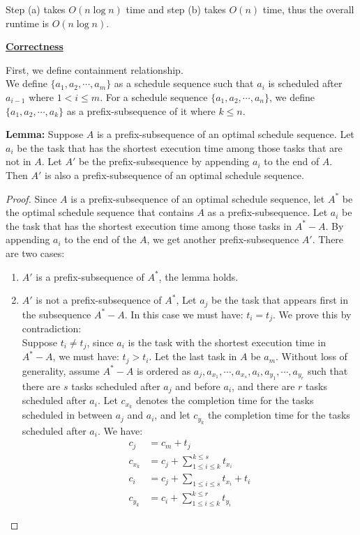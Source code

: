 \documentclass[11pt]{article}
\begin{document}
\begin{enumerate}
Step (a) takes $O(n\log n)$ time and step (b) takes $O(n)$ time, thus
the overall runtime is $O(n\log n)$.

\underline{\textbf{Correctness}}

First, we define containment relationship.\\
We define $\{a_1,a_2,\cdots,a_m\}$ as a schedule sequence such that $a_i$
is scheduled after $a_{i-1}$ where $1 < i \leq m$.
For a schedule sequence $\{a_1,a_2,\cdots,a_n\}$, we define
$\{a_1,a_2,\cdots,a_k\}$ as a prefix-subsequence of it where $k \leq n$.

\textbf{Lemma:} Suppose $A$ is a prefix-subsequence of an optimal schedule
sequence. Let $a_i$ be the task that has the shortest execution time
among those tasks that are not in $A$. Let $A'$ be the
prefix-subsequence by appending $a_i$ to the end of $A$.
Then $A'$ is also a prefix-subsequence of an optimal schedule sequence.

\begin{proof}
  Since $A$ is a prefix-subsequence of an optimal schedule sequence,
  let $A^*$ be the optimal schedule sequence that contains $A$ as a
  prefix-subsequence. Let $a_i$ be the task that has the shortest
  execution time among those tasks in $A^*-A$. By appending $a_i$ to
  the end of the $A$, we get another prefix-subsequence $A'$. There
  are two cases:
  \begin{enumerate}
  \item $A'$ is a prefix-subsequence of $A^*$, the lemma holds.
  \item $A'$ is not a prefix-subsequence of $A^*$, Let $a_j$ be the
    task that appears first in the subsequence $A^*-A$. In
    this case we must have: $t_i = t_j$. We prove this by 
    contradiction:\\
    Suppose $t_i \neq t_j$, since $a_i$ is the task with the shortest
    execution time in $A^*-A$, we must have: $t_j > t_i$. Let the last
    task in $A$ be $a_m$. Without loss of generality, assume $A^*-A$
    is ordered as
    $a_j,a_{x_1},\cdots,a_{x_s},a_i,a_{y_1},\cdots,a_{y_r}$ such that
    there are $s$ tasks scheduled after $a_j$ and before $a_i$, and
    there are $r$ tasks scheduled after $a_i$. Let $c_{x_k}$ denotes
    the completion time for the tasks scheduled in between $a_j$ and
    $a_i$, and let $c_{y_k}$ the completion time for the tasks
    scheduled after $a_i$. We have:
    \begin{align}
      c_j &= c_m + t_j\\
      c_{x_k} &= c_j + \sum_{1 \leq i \leq k}^{k \leq s}t_{x_i}\\
      c_i &= c_j + \sum_{1 \leq i \leq s}t_{x_i} + t_i\\
      c_{y_k} &= c_i + \sum_{1 \leq i \leq k}^{k \leq r}t_{y_i}
    \end{align}


\end{enumerate}
\end{proof}
\end{enumerate}
\end{document}
